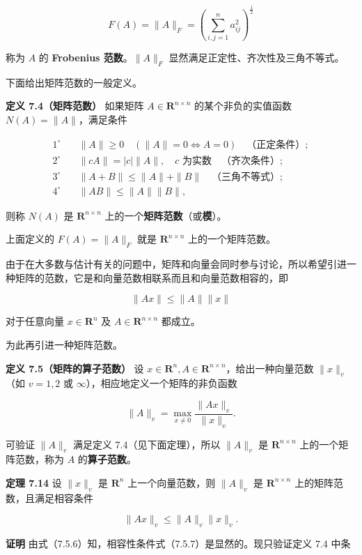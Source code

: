 \documentclass[
  10pt,
  fontset=fandol]{ctexart}
\begin{document}
\[
F(A)=\|A\|_F=\left(\sum_{i,j=1}^{n}a_{ij}^{2}\right)^{\frac12}
\]

称为 \(A\) 的 \textbf{Frobenius 范数}。\(\|A\|_F\) 显然满足正定性、齐次性及三角不等式。

下面给出矩阵范数的一般定义。

\textbf{定义 7.4（矩阵范数）} 如果矩阵 \(A\in\mathbf R^{n\times n}\) 的某个非负的实值函数 \(N(A)=\|A\|\)，满足条件

\[
\begin{aligned}
1^\circ\quad &\|A\|\geqslant0\quad(\|A\|=0\Longleftrightarrow A=0)\quad\text{（正定条件）};\\
2^\circ\quad &\|cA\|=|c|\|A\|,\quad c\text{ 为实数}\quad\text{（齐次条件）};\\
3^\circ\quad &\|A+B\|\leqslant\|A\|+\|B\|\quad\text{（三角不等式）};\\
4^\circ\quad &\|AB\|\leqslant\|A\|\|B\|,
\end{aligned}
\tag{7.5.4}
\]

则称 \(N(A)\) 是 \(\mathbf R^{n\times n}\) 上的一个\textbf{矩阵范数}（或\textbf{模}）。

上面定义的 \(F(A)=\|A\|_F\) 就是 \(\mathbf R^{n\times n}\) 上的一个矩阵范数。

由于在大多数与估计有关的问题中，矩阵和向量会同时参与讨论，所以希望引进一种矩阵的范数，它是和向量范数相联系而且和向量范数相容的，即

\[
\|Ax\|\leqslant\|A\|\|x\|
\tag{7.5.5}
\]

对于任意向量 \(x\in\mathbf R^n\) 及 \(A\in\mathbf R^{n\times n}\) 都成立。

为此再引进一种矩阵范数。

\textbf{定义 7.5（矩阵的算子范数）} 设 \(x\in\mathbf R^n,A\in\mathbf R^{n\times n}\)，给出一种向量范数 \(\|x\|_v\)（如 \(v=1,2\) 或 \(\infty\)），相应地定义一个矩阵的非负函数

\[
\|A\|_v=\max_{x\neq0}\frac{\|Ax\|_v}{\|x\|_v}.
\tag{7.5.6}
\]

可验证 \(\|A\|_v\) 满足定义 7.4（见下面定理），所以 \(\|A\|_v\) 是 \(\mathbf R^{n\times n}\) 上的一个矩阵范数，称为 \(A\) 的\textbf{算子范数}。

\textbf{定理 7.14} 设 \(\|x\|_v\) 是 \(\mathbf R^n\) 上一个向量范数，则 \(\|A\|_v\) 是 \(\mathbf R^{n\times n}\) 上的矩阵范数，且满足相容条件

\[
\|Ax\|_v\leqslant\|A\|_v\|x\|_v.
\tag{7.5.7}
\]

\textbf{证明} 由式（7.5.6）知，相容性条件式（7.5.7）是显然的。现只验证定义 7.4 中条
\end{document}
